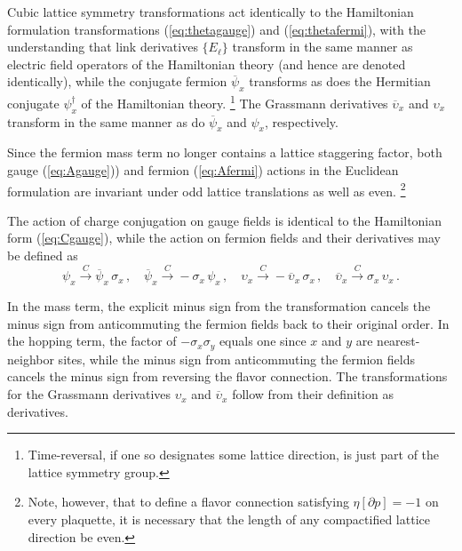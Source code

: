 \documentclass [12pt]{article}
\begin{document}
Cubic lattice symmetry transformations act identically to
the Hamiltonian formulation transformations
(\ref{eq:thetagauge}) and (\ref{eq:thetafermi}),
with the understanding that link derivatives $\{ E_\ell \}$ transform in
the same manner as electric field operators of the Hamiltonian theory
(and hence are denoted identically),
while the conjugate fermion $\overline\psi_x$ transforms as does 
the Hermitian conjugate $\psi^\dagger_x$ of the Hamiltonian theory.%
\footnote
    {%
    Time-reversal, if one so designates some lattice direction, is just
    part of the lattice symmetry group.
    }
The Grassmann derivatives $\overline \upsilon_x$ and $\upsilon_x$
transform in the same manner as do $\overline \psi_x$ and $\psi_x$, respectively.

Since the fermion mass term no longer contains a lattice staggering factor,
both gauge (\ref{eq:Agauge}))
and fermion (\ref{eq:Afermi}) actions in the Euclidean formulation
are invariant under odd lattice translations as well as even.%
\footnote
    {
    Note, however, that to define a flavor connection satisfying $\eta[\partial p] = -1$
    on every plaquette, it is necessary that the length of any compactified
    lattice direction be even.
    }

The action of charge conjugation on gauge fields is identical to the
Hamiltonian form (\ref{eq:Cgauge}), while the action on fermion fields
and their derivatives
may be defined as
\begin{equation}
    \psi_x \xrightarrow{C} \overline\psi_x \,\sigma_x \,,\quad
    \overline\psi_x \xrightarrow{C} - \sigma_x \, \psi_x \,,\quad
    \upsilon_x \xrightarrow{C} -\overline \upsilon_x \,\sigma_x \,,\quad
    \overline \upsilon_x \xrightarrow{C} \sigma_x \, \upsilon_x \,.
\label{eq:Cfermieuclid}
\end{equation}

In the mass term, the explicit minus sign from the transformation cancels
the minus sign from anticommuting the fermion fields back to their original order.
In the hopping term, the factor of $-\sigma_x \sigma_y$ equals one  since $x$ and $y$
are nearest-neighbor sites, while the minus sign from anticommuting the fermion
fields cancels the minus sign from reversing the flavor connection.
The transformations for the Grassmann derivatives $\upsilon_x$ and $\overline\upsilon_x$
follow from their definition as derivatives.
\end{document}
